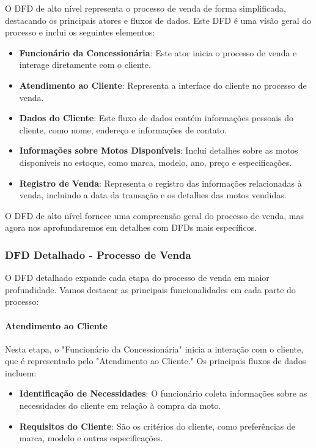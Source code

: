 O DFD de alto nível representa o processo de venda de forma simplificada, destacando os principais atores e fluxos de dados. Este DFD é uma visão geral do processo e inclui os seguintes elementos:

\begin{itemize}
	\item \textbf{Funcionário da Concessionária}: Este ator inicia o processo de venda e interage diretamente com o cliente.
	\item \textbf{Atendimento ao Cliente}: Representa a interface do cliente no processo de venda.
	\item \textbf{Dados do Cliente}: Este fluxo de dados contém informações pessoais do cliente, como nome, endereço e informações de contato.
	\item \textbf{Informações sobre Motos Disponíveis}: Inclui detalhes sobre as motos disponíveis no estoque, como marca, modelo, ano, preço e especificações.
	\item \textbf{Registro de Venda}: Representa o registro das informações relacionadas à venda, incluindo a data da transação e os detalhes das motos vendidas.
\end{itemize}

O DFD de alto nível fornece uma compreensão geral do processo de venda, mas agora nos aprofundaremos em detalhes com DFDs mais específicos.

\subsubsection{DFD Detalhado - Processo de Venda}

O DFD detalhado expande cada etapa do processo de venda em maior profundidade. Vamos destacar as principais funcionalidades em cada parte do processo:

\paragraph{Atendimento ao Cliente}

Nesta etapa, o "Funcionário da Concessionária" inicia a interação com o cliente, que é representado pelo "Atendimento ao Cliente." Os principais fluxos de dados incluem:

\begin{itemize}
	\item \textbf{Identificação de Necessidades}: O funcionário coleta informações sobre as necessidades do cliente em relação à compra da moto.
	\item \textbf{Requisitos do Cliente}: São os critérios do cliente, como preferências de marca, modelo e outras especificações.
\end{itemize}

